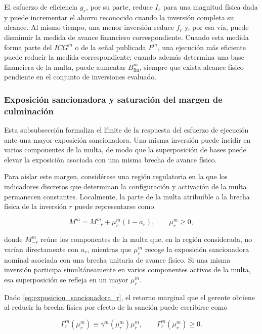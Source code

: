 El esfuerzo de eficiencia \(g_r\), por su parte, reduce \(I_r\) para una magnitud física dada y puede incrementar el ahorro reconocido cuando la inversión completa su alcance. Al mismo tiempo, una menor inversión reduce \(f_r\) y, por esa vía, puede disminuir la medida de avance financiero correspondiente. Cuando esta medida forma parte del \(ICG^m\) o de la señal publicada \(P^m\), una ejecución más eficiente puede reducir la medida correspondiente; cuando además determina una base financiera de la multa, puede aumentar \(B_{\mathrm{fin}}^m\), siempre que exista alcance físico pendiente en el conjunto de inversiones evaluado.

\subsubsection{Exposición sancionadora y saturación del margen de culminación}

Esta subsubsección formaliza el límite de la respuesta del esfuerzo de ejecución ante una mayor exposición sancionadora. Una misma inversión puede incidir en varios componentes de la multa, de modo que la superposición de bases puede elevar la exposición asociada con una misma brecha de avance físico.

Para aislar este margen, considérese una región regulatoria en la que los indicadores discretos que determinan la configuración y activación de la multa permanecen constantes. Localmente, la parte de la multa atribuible a la brecha física de la inversión \(r\) puede representarse como

\begin{equation}
\label{eq:exposicion_sancionadora_r}
M^m
=
M_{-r}^m
+
\mu_r^m(1-a_r),
\qquad
\mu_r^m\geq0,
\end{equation}

donde \(M_{-r}^m\) reúne los componentes de la multa que, en la región considerada, no varían directamente con \(a_r\), mientras que \(\mu_r^m\) recoge la exposición sancionadora nominal asociada con una brecha unitaria de avance físico. Si una misma inversión participa simultáneamente en varios componentes activos de la multa, esa superposición se refleja en un mayor \(\mu_r^m\).

Dado \eqref{eq:exposicion_sancionadora_r}, el retorno marginal que el gerente obtiene al reducir la brecha física por efecto de la sanción puede escribirse como

\begin{equation}
\label{eq:ganancia_evitar_incumplimiento}
\Gamma_r^m(\mu_r^m)
\equiv
\gamma^m(\mu_r^m)\mu_r^m,
\qquad
\Gamma_r^m(\mu_r^m)\geq0.
\end{equation}

